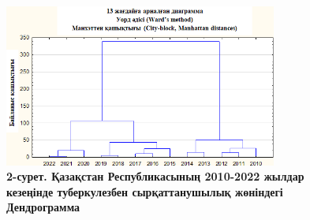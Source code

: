 \begin{figure}[H]
	\centering
	\includegraphics[width=0.8\textwidth]{assets/169}
	\caption*{\bfseries 2-сурет. Қазақстан Республикасының 2010-2022 жылдар кезеңінде
  туберкулезбен сырқаттанушылық жөніндегі Дендрограмма}
\end{figure}


